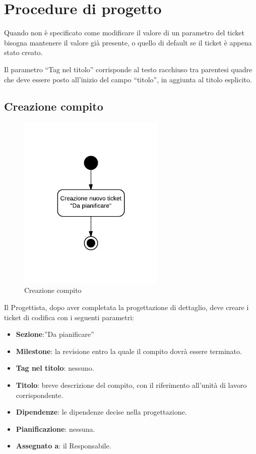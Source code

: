 \section{Procedure di progetto}
\label{procedurediprogetto}

Quando non è specificato come modificare il valore di un parametro del ticket bisogna mantenere il valore già presente, o quello di default se il ticket è appena stato creato.

Il parametro ``Tag nel titolo'' corrisponde al testo racchiuso tra parentesi quadre che deve essere posto all'inizio del campo ``titolo'', in aggiunta al titolo esplicito.

\subsection{Creazione compito}

\begin{figure}[H]
    \centering
    \includegraphics[width=7cm]{uml-processi/Creazione_compito.png}
    \caption{Creazione compito}
\end{figure}

Il Progettista, dopo aver completata la progettazione di dettaglio, deve creare i ticket di codifica con i seguenti parametri:
\begin{itemize}
 \item \textbf{Sezione}:''Da pianificare''
 \item \textbf{Milestone}: la revisione entro la quale il compito dovrà essere terminato.
 \item \textbf{Tag nel titolo}: nessuno.
 \item \textbf{Titolo}: breve descrizione del compito, con il riferimento all'unità di lavoro corrispondente.
 \item \textbf{Dipendenze}: le dipendenze decise nella progettazione.
 \item \textbf{Pianificazione}: nessuna.
 \item \textbf{Assegnato a}: il Responsabile.
\end{itemize}


